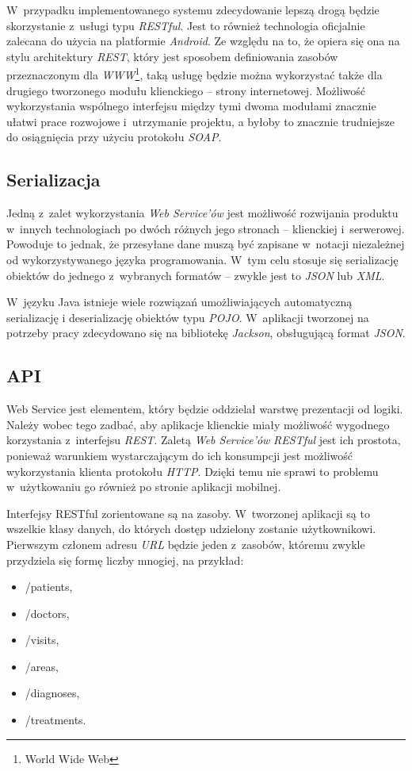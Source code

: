 \documentclass[11pt]{aghdpl}
\begin{document}
W~przypadku implementowanego systemu zdecydowanie lepszą drogą będzie skorzystanie z~usługi typu \emph{RESTful}. Jest to również technologia oficjalnie zalecana do użycia na platformie \emph{Android}. Ze względu na to, że opiera się ona na stylu architektury \emph{REST}, który jest sposobem definiowania zasobów przeznaczonym dla \emph{WWW}\footnote{World Wide Web}, taką usługę będzie można wykorzystać także dla drugiego tworzonego modułu klienckiego -- strony internetowej. Możliwość wykorzystania wspólnego interfejsu między tymi dwoma modułami znacznie ułatwi prace rozwojowe i~utrzymanie projektu, a byłoby to znacznie trudniejsze do osiągnięcia przy użyciu protokołu \emph{SOAP}.

\subsection{Serializacja}

Jedną z~zalet wykorzystania \emph{Web Service'ów} jest możliwość rozwijania produktu w~innych technologiach po dwóch różnych jego stronach -- klienckiej i~serwerowej. Powoduje to jednak, że przesyłane dane muszą być zapisane w~notacji niezależnej od wykorzystywanego języka programowania. W~tym celu stosuje się serializację obiektów do jednego z~wybranych formatów -- zwykle jest to \emph{JSON} lub \emph{XML}.

W~języku Java istnieje wiele rozwiązań umożliwiających automatyczną serializację i deserializację obiektów typu \emph{POJO}. W~aplikacji tworzonej na potrzeby pracy zdecydowano się na bibliotekę \emph{Jackson}, obsługującą format \emph{JSON}.

\subsection{API}

Web Service jest elementem, który będzie oddzielał warstwę prezentacji od logiki. Należy wobec tego zadbać, aby aplikacje klienckie miały możliwość wygodnego korzystania z~interfejsu \emph{REST}. Zaletą \emph{Web Service'ów} \emph{RESTful} jest ich prostota, ponieważ warunkiem wystarczającym do ich konsumpcji jest możliwość wykorzystania klienta protokołu \emph{HTTP}. Dzięki temu nie sprawi to problemu w~użytkowaniu go również po stronie aplikacji mobilnej.

Interfejsy RESTful zorientowane są na zasoby. W~tworzonej aplikacji są to wszelkie klasy danych, do których dostęp udzielony zostanie użytkownikowi. Pierwszym członem adresu \emph{URL} będzie jeden z~zasobów, któremu zwykle przydziela się formę liczby mnogiej, na przykład:
\begin{itemize}
	\item /patients,
	\item /doctors,
	\item /visits,
	\item /areas,
	\item /diagnoses,
	\item /treatments.
\end{itemize}
\end{document}
